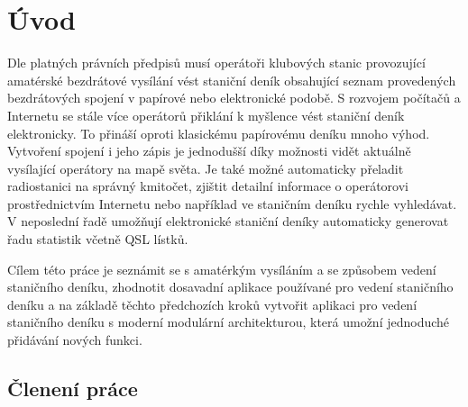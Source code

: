 \chapter{Úvod}
\label{uvod}

Dle platných právních předpisů musí operátoři klubových stanic provozující amatérské bezdrátové vysílání
 vést staniční deník obsahující seznam provedených bezdrátových spojení
v papírové nebo elektronické podobě.
S rozvojem počítačů a Internetu se stále více operátorů přiklání k myšlence vést staniční deník elektronicky.
To přináší oproti klasickému papírovému deníku mnoho výhod. Vytvoření spojení i jeho zápis je jednodušší
díky možnosti vidět aktuálně vysílající operátory na mapě světa. Je také možné automaticky přeladit radiostanici na správný
kmitočet, zjištit detailní informace o operátorovi prostřednictvím Internetu nebo například ve staničním deníku
rychle vyhledávat. V neposlední řadě umožňují elektronické staniční deníky automaticky generovat řadu
statistik včetně QSL lístků.

Cílem této práce je seznámit se s amatérkým vysíláním a se způsobem vedení staničního deníku,
zhodnotit dosavadní aplikace používané pro vedení staničního deníku a 
na základě těchto předchozích kroků vytvořit aplikaci pro vedení staničního deníku s moderní modulární architekturou,
která umožní jednoduché přidávání nových funkci.



\section{Členení práce}

